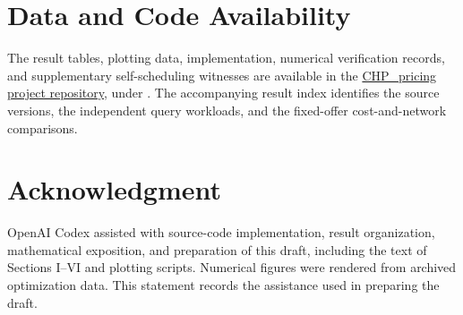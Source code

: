 \documentclass[journal]{IEEEtran}
\begin{document}
\section*{Data and Code Availability}
The result tables, plotting data, implementation, numerical verification records, and supplementary self-scheduling witnesses are available in the \href{https://github.com/soda831143/CHP_pricing}{CHP\_pricing project repository}, under . The accompanying result index identifies the source versions, the independent query workloads, and the fixed-offer cost-and-network comparisons.

\section*{Acknowledgment}
OpenAI Codex assisted with source-code implementation, result organization, mathematical exposition, and preparation of this draft, including the text of Sections I--VI and plotting scripts. Numerical figures were rendered from archived optimization data. This statement records the assistance used in preparing the draft.



\end{document}
